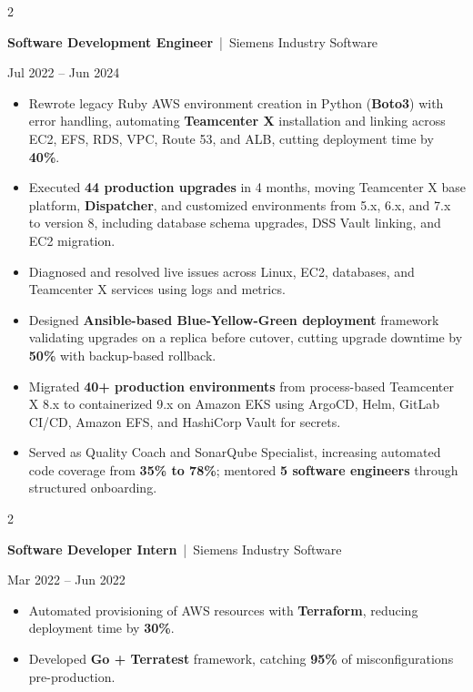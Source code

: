 \documentclass[10pt, letterpaper]{article}
\newenvironment{highlights}{
    \begin{itemize}[
        topsep=0.10 cm,
        parsep=0.06 cm,
        partopsep=0pt,
        itemsep=0.06 cm,
        leftmargin=12pt
    ]
}{
    \end{itemize}
}
\newenvironment{twocolentry}[2][]{
    \onecolentry
    \def\secondColumn{#2}
    \setcolumnwidth{\fill, 4.5 cm}
    \begin{paracol}{2}
}{
    \switchcolumn \raggedleft \secondColumn
    \end{paracol}
    \endonecolentry
}
\begin{document}
\vspace{0.15 cm}

\begin{twocolentry}{Jul 2022 -- Jun 2024}
\textbf{Software Development Engineer} \,|\, Siemens Industry Software
\end{twocolentry}
\begin{highlights}
  \item Rewrote legacy Ruby AWS environment creation in Python (\textbf{Boto3}) with error handling, automating \textbf{Teamcenter X} installation and linking across EC2, EFS, RDS, VPC, Route 53, and ALB, cutting deployment time by \textbf{40\%}.
  \item Executed \textbf{44 production upgrades} in 4 months, moving Teamcenter X base platform, \textbf{Dispatcher}, and customized environments from 5.x, 6.x, and 7.x to version 8, including database schema upgrades, DSS Vault linking, and EC2 migration.
  \item Diagnosed and resolved live issues across Linux, EC2, databases, and Teamcenter X services using logs and metrics.
  \item Designed \textbf{Ansible-based Blue-Yellow-Green deployment} framework validating upgrades on a replica before cutover, cutting upgrade downtime by \textbf{50\%} with backup-based rollback.
  \item Migrated \textbf{40+ production environments} from process-based Teamcenter X 8.x to containerized 9.x on Amazon EKS using ArgoCD, Helm, GitLab CI/CD, Amazon EFS, and HashiCorp Vault for secrets.
  \item Served as Quality Coach and SonarQube Specialist, increasing automated code coverage from \textbf{35\% to 78\%}; mentored \textbf{5 software engineers} through structured onboarding.
\end{highlights}

\vspace{0.15 cm}

\begin{twocolentry}{Mar 2022 -- Jun 2022}
\textbf{Software Developer Intern} \,|\, Siemens Industry Software
\end{twocolentry}
\begin{highlights}
  \item Automated provisioning of AWS resources with \textbf{Terraform}, reducing deployment time by \textbf{30\%}.
  \item Developed \textbf{Go + Terratest} framework, catching \textbf{95\%} of misconfigurations pre-production.
\end{highlights}
\end{document}

